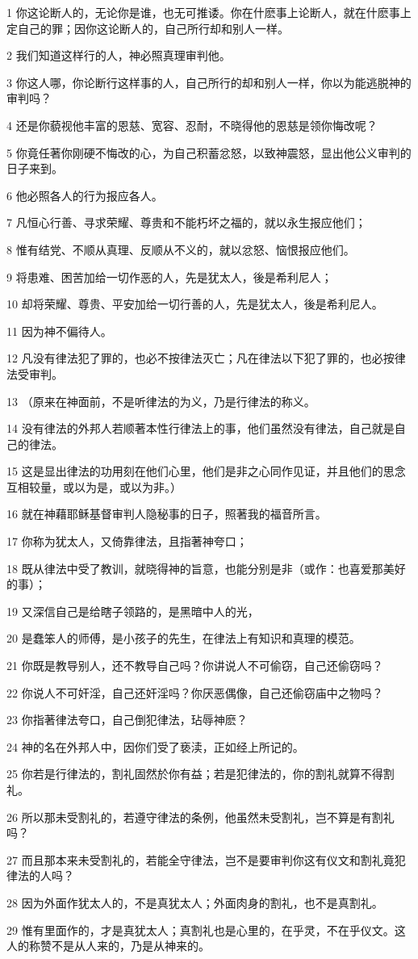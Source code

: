 \par 1 你这论断人的，无论你是谁，也无可推诿。你在什麽事上论断人，就在什麽事上定自己的罪；因你这论断人的，自己所行却和别人一样。
\par 2 我们知道这样行的人，神必照真理审判他。
\par 3 你这人哪，你论断行这样事的人，自己所行的却和别人一样，你以为能逃脱神的审判吗？
\par 4 还是你藐视他丰富的恩慈、宽容、忍耐，不晓得他的恩慈是领你悔改呢？
\par 5 你竟任著你刚硬不悔改的心，为自己积蓄忿怒，以致神震怒，显出他公义审判的日子来到。
\par 6 他必照各人的行为报应各人。
\par 7 凡恒心行善、寻求荣耀、尊贵和不能朽坏之福的，就以永生报应他们；
\par 8 惟有结党、不顺从真理、反顺从不义的，就以忿怒、恼恨报应他们。
\par 9 将患难、困苦加给一切作恶的人，先是犹太人，後是希利尼人；
\par 10 却将荣耀、尊贵、平安加给一切行善的人，先是犹太人，後是希利尼人。
\par 11 因为神不偏待人。
\par 12 凡没有律法犯了罪的，也必不按律法灭亡；凡在律法以下犯了罪的，也必按律法受审判。
\par 13 （原来在神面前，不是听律法的为义，乃是行律法的称义。
\par 14 没有律法的外邦人若顺著本性行律法上的事，他们虽然没有律法，自己就是自己的律法。
\par 15 这是显出律法的功用刻在他们心里，他们是非之心同作见证，并且他们的思念互相较量，或以为是，或以为非。）
\par 16 就在神藉耶稣基督审判人隐秘事的日子，照著我的福音所言。
\par 17 你称为犹太人，又倚靠律法，且指著神夸口；
\par 18 既从律法中受了教训，就晓得神的旨意，也能分别是非（或作：也喜爱那美好的事）；
\par 19 又深信自己是给瞎子领路的，是黑暗中人的光，
\par 20 是蠢笨人的师傅，是小孩子的先生，在律法上有知识和真理的模范。
\par 21 你既是教导别人，还不教导自己吗？你讲说人不可偷窃，自己还偷窃吗？
\par 22 你说人不可奸淫，自己还奸淫吗？你厌恶偶像，自己还偷窃庙中之物吗？
\par 23 你指著律法夸口，自己倒犯律法，玷辱神麽？
\par 24 神的名在外邦人中，因你们受了亵渎，正如经上所记的。
\par 25 你若是行律法的，割礼固然於你有益；若是犯律法的，你的割礼就算不得割礼。
\par 26 所以那未受割礼的，若遵守律法的条例，他虽然未受割礼，岂不算是有割礼吗？
\par 27 而且那本来未受割礼的，若能全守律法，岂不是要审判你这有仪文和割礼竟犯律法的人吗？
\par 28 因为外面作犹太人的，不是真犹太人；外面肉身的割礼，也不是真割礼。
\par 29 惟有里面作的，才是真犹太人；真割礼也是心里的，在乎灵，不在乎仪文。这人的称赞不是从人来的，乃是从神来的。

